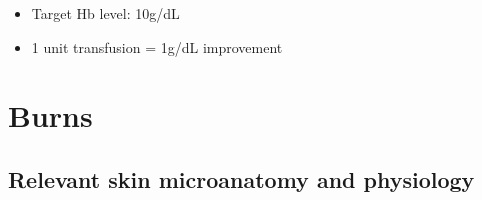\documentclass[
  12pt,
]{memoir}
\providecommand{\tightlist}{%
  \setlength{\itemsep}{0pt}\setlength{\parskip}{0pt}}
\begin{document}
\begin{itemize}
\tightlist
\item
  Target Hb level: 10g/dL
\item
  1 unit transfusion = 1g/dL improvement
\end{itemize}

\pagebreak

\hypertarget{burns}{%
\chapter{Burns}\label{burns}}

\hypertarget{relevant-skin-microanatomy-and-physiology}{%
\section{Relevant skin microanatomy and
physiology}\label{relevant-skin-microanatomy-and-physiology}}
\end{document}
